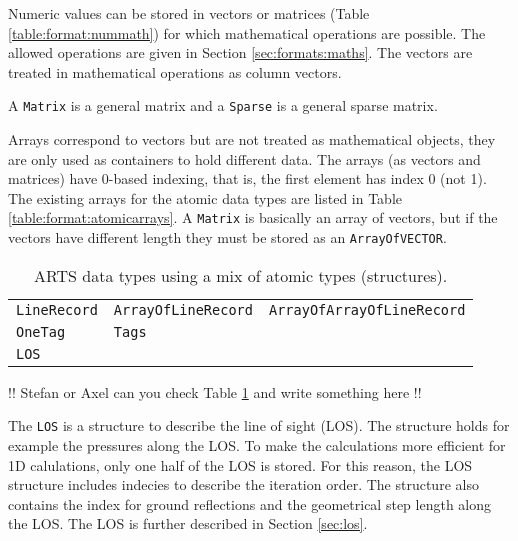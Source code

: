 Numeric values can be stored in vectors or matrices (Table
\ref{table:format:nummath}) for which mathematical operations are
possible. The allowed operations are given in Section
\ref{sec:formats:maths}.  The vectors are treated in mathematical
operations as column vectors.

A \verb|Matrix| is a general matrix and a \verb|Sparse| is a general
sparse matrix. 



 \label{sec:formats:atomic_arrays}
 
Arrays correspond to vectors but are not treated as mathematical
objects, they are only used as containers to hold different data.
The arrays (as vectors and matrices) have 0-based indexing, that is,
the first element has index 0 (not 1). The existing arrays for the
atomic data types are listed in Table \ref{table:format:atomicarrays}.
A \verb|Matrix| is basically an array of vectors, but if the vectors
have different length they must be stored as an \verb|ArrayOfVECTOR|.


 \label{sec:formats:others}

 \begin{table}[t]
  \begin{tabular}{l l l}
   \verb|LineRecord| & \verb|ArrayOfLineRecord| & \verb|ArrayOfArrayOfLineRecord| \\
   \verb|OneTag|     & \verb|Tags|   & \\
   \verb|LOS| & & \\
  \end{tabular}
  \caption{ARTS data types using a mix of atomic types (structures).}
  \label{table:format:structures}
 \end{table}
 
!! Stefan or Axel can you check Table \ref{table:format:structures} and
write something here !!

The \verb|LOS| is a structure to describe the line of sight (LOS).
The structure holds for example the pressures along the LOS. To make the
calculations more efficient for 1D calulations, only one half of the
LOS is stored.  For this reason, the LOS structure includes indecies
to describe the iteration order. The structure also contains the
index for ground reflections and the geometrical step length along
the LOS. The LOS is further described in Section \ref{sec:los}.


\label{sec:formats:maths}
 
